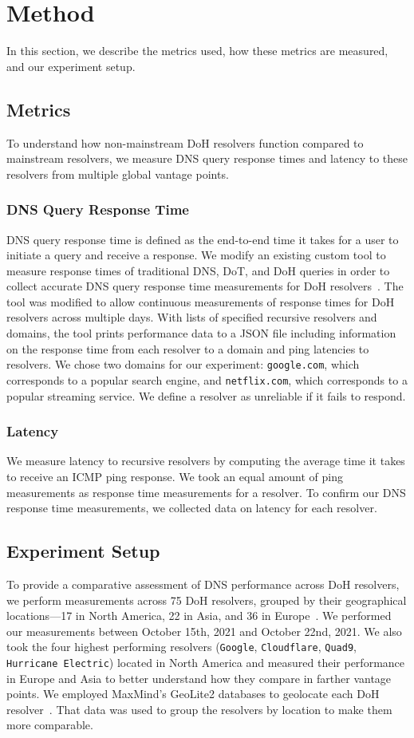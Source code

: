 \section{Method}\label{sec:method}
In this section, we describe the metrics used, how these metrics are measured, and our experiment setup.

\subsection{Metrics}
To understand how non-mainstream DoH resolvers function compared to mainstream resolvers, we measure DNS query response times and latency to these resolvers from multiple global vantage points.

\subsubsection{DNS Query Response Time}
DNS query response time is defined as the end-to-end time it takes for a user to initiate a query and receive a response.
We modify an existing custom tool to measure response times of traditional DNS, DoT, and DoH queries in order to collect accurate DNS query response time measurements for DoH resolvers~\cite{5}.
The tool was modified to allow continuous measurements of response times for DoH resolvers across multiple days.
With lists of specified recursive resolvers and domains, the tool prints performance data to a JSON file including information on the response time from each resolver to a domain and ping latencies to resolvers.
We chose two domains for our experiment: \texttt{google.com}, which corresponds to a popular search engine, and \texttt{netflix.com}, which corresponds to a popular streaming service.
We define a resolver as unreliable if it fails to respond.  

\subsubsection{Latency}
We measure latency to recursive resolvers by computing the average time it takes to receive an ICMP ping response.
We took an equal amount of ping measurements as response time measurements for a resolver.
To confirm our DNS response time measurements, we collected data on latency for each resolver. 

\subsection{Experiment Setup}
To provide a comparative assessment of DNS performance across DoH resolvers, we perform measurements across 75 DoH resolvers, grouped by their geographical locations—17 in North America, 22 in Asia, and 36 in Europe~\cite{10}.
We performed our measurements between October 15th, 2021 and October 22nd, 2021.
We also took the four highest performing resolvers (\texttt{Google}, \texttt{Cloudflare}, \texttt{Quad9}, \texttt{Hurricane Electric}) located in North America and measured their performance in Europe and Asia to better understand how they compare in farther vantage points.  
We employed MaxMind's GeoLite2 databases to geolocate each DoH resolver~\cite{16}.
That data was used to group the resolvers by location to make them more comparable. 

